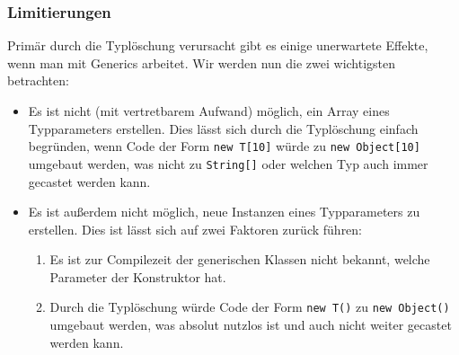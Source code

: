 	\subsubsection{Limitierungen}
		Primär durch die Typlöschung verursacht gibt es einige unerwartete Effekte, wenn man mit Generics arbeitet. Wir werden nun die zwei wichtigsten betrachten:
		\begin{itemize}
			\item Es ist nicht (mit vertretbarem Aufwand) möglich, ein Array eines Typparameters erstellen. Dies lässt sich durch die Typlöschung einfach begründen, wenn Code der Form \texttt{new T[10]} würde zu \texttt{new Object[10]} umgebaut werden, was nicht zu \texttt{String[]} oder welchen Typ auch immer gecastet werden kann.
			\item Es ist außerdem nicht möglich, neue Instanzen eines Typparameters zu erstellen. Dies ist lässt sich auf zwei Faktoren zurück führen:
				\begin{enumerate}
					\item Es ist zur Compilezeit der generischen Klassen nicht bekannt, welche Parameter der Konstruktor hat.
					\item Durch die Typlöschung würde Code der Form \texttt{new T()} zu \texttt{new Object()} umgebaut werden, was absolut nutzlos ist und auch nicht weiter gecastet werden kann.
				\end{enumerate}
		\end{itemize}

